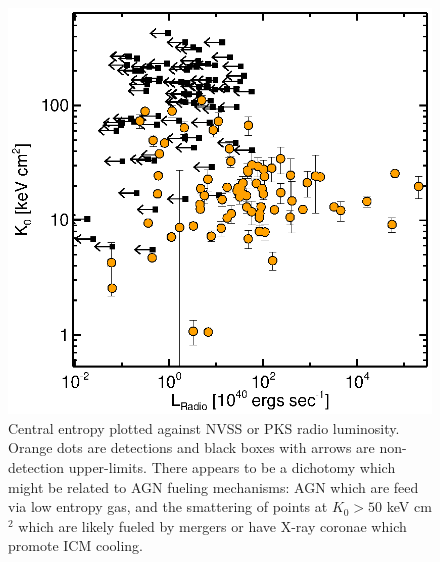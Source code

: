 \documentclass[11pt]{article}
\begin{document}
\begin{figure}[t]
\begin{minipage}[t]{0.5\linewidth}
        \includegraphics*[width=\textwidth, trim=28mm 8mm 30mm 10mm, clip]{rad}
        \caption{\small Central entropy plotted against NVSS or PKS radio
	luminosity. Orange dots are detections and black boxes with
	arrows are non-detection upper-limits. There appears to be a dichotomy which might be related to AGN
	fueling mechanisms: AGN which are feed via low entropy gas, and the
	smattering of points at $K_0 > 50$ keV cm$^2$ which are likely
	fueled by mergers or have X-ray coronae which promote ICM cooling.}
        \label{fig:rad}
    \end{minipage}
\end{figure}
\end{document}
